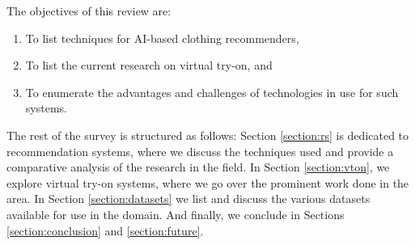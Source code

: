 	The objectives of this review are:

	\begin{enumerate}
		\item To list techniques for AI-based clothing recommenders,
		\item To list the current research on virtual try-on, and
		\item To enumerate the advantages and challenges of technologies in use for such systems.
	\end{enumerate}

	The rest of the survey is structured as follows: Section \ref{section:rs} is dedicated to recommendation systems, where we discuss the techniques used and provide a comparative analysis of the research in the field. In Section \ref{section:vton}, we explore virtual try-on systems, where we go over the prominent work done in the area. In Section \ref{section:datasets} we list and discuss the various datasets available for use in the domain. And finally, we conclude in Sections \ref{section:conclusion} and \ref{section:future}.